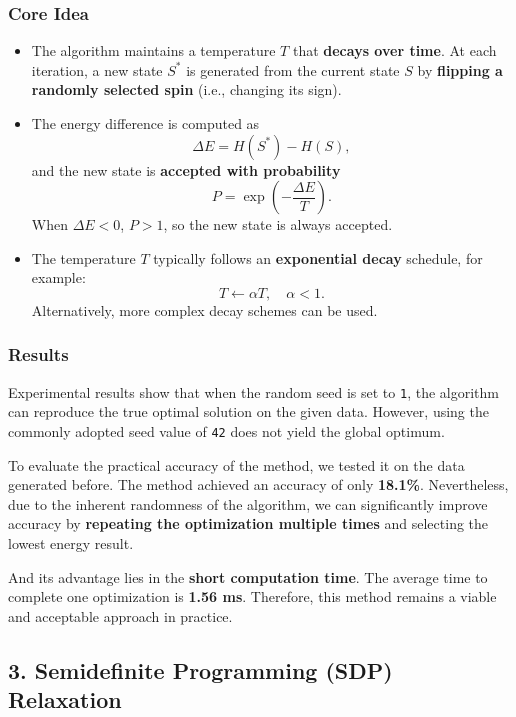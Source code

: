 \documentclass{article}
\begin{document}
\subsubsection*{Core Idea}

\begin{itemize}
    \item The algorithm maintains a temperature $T$ that \textbf{decays over time}. At each iteration, a new state $S^*$ is generated from the current state $S$ by \textbf{flipping a randomly selected spin} (i.e., changing its sign).
    
    \item The energy difference is computed as
    \[
    \Delta E = H\left(S^*\right) - H\left(S\right),
    \]
    and the new state is \textbf{accepted with probability}
    \[
    P = \exp\left(-\frac{\Delta E}{T}\right).
    \]
    When $\Delta E < 0$, $P > 1$, so the new state is always accepted.
    
    \item The temperature $T$ typically follows an \textbf{exponential decay} schedule, for example:
    \[
    T \leftarrow \alpha T,\quad \alpha < 1.
    \]
    Alternatively, more complex decay schemes can be used.
\end{itemize}

\subsubsection*{Results}

Experimental results show that when the random seed is set to \texttt{1}, the algorithm can reproduce the true optimal solution on the given data. However, using the commonly adopted seed value of \texttt{42} does not yield the global optimum.

To evaluate the practical accuracy of the method, we tested it on the data generated before. The method achieved an accuracy of only \textbf{18.1\%}. Nevertheless, due to the inherent randomness of the algorithm, we can significantly improve accuracy by \textbf{repeating the optimization multiple times} and selecting the lowest energy result.

And its advantage lies in the \textbf{short computation time}. The average time to complete one optimization is \textbf{1.56 ms}. Therefore, this method remains a viable and acceptable approach in practice.

\subsection*{3. Semidefinite Programming (SDP) Relaxation}
\end{document}
